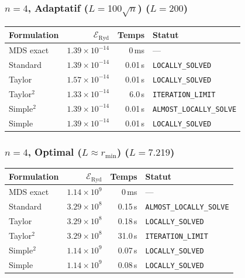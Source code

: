 \subsubsection{$n=4$, Adaptatif ($L{=}100\sqrt{n}$) ($L=200$)}
\begin{longtable}{@{}lrrl@{}}
  \toprule
  Formulation & $\mathcal{E}_{\mathrm{Ryd}}$ & Temps & Statut \\
  \midrule
  \endhead
  MDS exact & $1.39\times10^{-14}$ & 0\,ms & --- \\
  Standard & $1.39\times10^{-14}$ & 0.01\,s & \texttt{LOCALLY\_SOLVED} \\
  Taylor & $1.57\times10^{-14}$ & 0.01\,s & \texttt{LOCALLY\_SOLVED} \\
  Taylor$^2$ & $1.33\times10^{-14}$ & 6.0\,s & \texttt{ITERATION\_LIMIT} \\
  Simple$^2$ & $1.39\times10^{-14}$ & 0.01\,s & \texttt{ALMOST\_LOCALLY\_SOLVE} \\
  Simple & $1.39\times10^{-14}$ & 0.01\,s & \texttt{LOCALLY\_SOLVED} \\
  \bottomrule
\end{longtable}

\subsubsection{$n=4$, Optimal ($L{\approx}r_{\min}$) ($L=7.219$)}
\begin{longtable}{@{}lrrl@{}}
  \toprule
  Formulation & $\mathcal{E}_{\mathrm{Ryd}}$ & Temps & Statut \\
  \midrule
  \endhead
  MDS exact & $1.14\times10^{9}$ & 0\,ms & --- \\
  Standard & $3.29\times10^{8}$ & 0.15\,s & \texttt{ALMOST\_LOCALLY\_SOLVE} \\
  Taylor & $3.29\times10^{8}$ & 0.18\,s & \texttt{LOCALLY\_SOLVED} \\
  Taylor$^2$ & $3.29\times10^{8}$ & 31.0\,s & \texttt{ITERATION\_LIMIT} \\
  Simple$^2$ & $1.14\times10^{9}$ & 0.07\,s & \texttt{LOCALLY\_SOLVED} \\
  Simple & $1.14\times10^{9}$ & 0.08\,s & \texttt{LOCALLY\_SOLVED} \\
  \bottomrule
\end{longtable}

